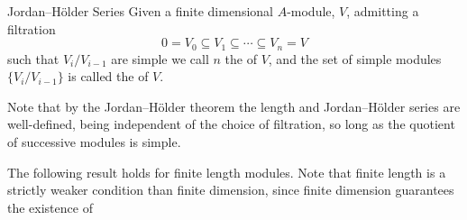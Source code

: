 \begin{dfn}{Jordan--H\"older Series}{}
    Given a finite dimensional \(A\)-module, \(V\), admitting a filtration
    \begin{equation}
        0 = V_0 \subseteq V_1 \subseteq \dotsb \subseteq V_n = V
    \end{equation}
    such that \(V_i/V_{i-1}\) are simple we call \(n\) the  of \(V\), and the set of simple modules \(\{V_i/V_{i-1}\}\) is called the  of \(V\).
\end{dfn}

Note that by the Jordan--H\"older theorem the length and Jordan--H\"older series are well-defined, being independent of the choice of filtration, so long as the quotient of successive modules is simple.

The following result holds for finite length modules.
Note that finite length is a strictly weaker condition than finite dimension, since finite dimension guarantees the existence of 

